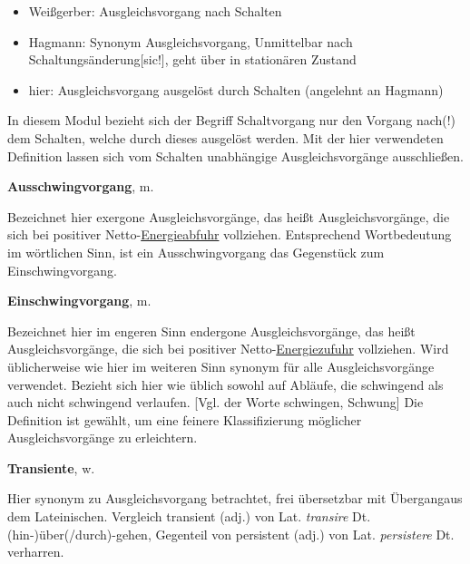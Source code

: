 {\begin{frame}
        \begin{itemize}
            \item Weißgerber: Ausgleichsvorgang nach Schalten\cite[S. 1]{weissgerber3}
            \item Hagmann: Synonym Ausgleichsvorgang, Unmittelbar nach Schaltungsänderung[sic!], geht über in stationären Zustand\cite[S. 362]{hagmann}
            \item hier: Ausgleichsvorgang ausgelöst durch Schalten (angelehnt an Hagmann)
        \end{itemize}

        In diesem Modul bezieht sich der Begriff Schaltvorgang nur den Vorgang nach(!) dem Schalten, welche durch dieses ausgelöst werden.
        Mit der hier verwendeten Definition lassen sich vom Schalten unabhängige Ausgleichsvorgänge ausschließen. 


    \textbf{Ausschwingvorgang}, m.

        Bezeichnet hier exergone Ausgleichsvorgänge, das heißt Ausgleichsvorgänge, die sich bei positiver Netto-\underline{Energieabfuhr} vollziehen. 
        Entsprechend Wortbedeutung im wörtlichen Sinn, ist ein Ausschwingvorgang das Gegenstück zum Einschwingvorgang.

    \textbf{Einschwingvorgang}, m.

        Bezeichnet hier im engeren Sinn endergone Ausgleichsvorgänge, das heißt Ausgleichsvorgänge, die sich bei positiver Netto-\underline{Energiezufuhr} vollziehen. 
        Wird üblicherweise wie hier im weiteren Sinn synonym für alle Ausgleichsvorgänge verwendet.
        Bezieht sich hier wie üblich sowohl auf Abläufe, die schwingend als auch nicht schwingend verlaufen. [Vgl. der Worte schwingen, Schwung]
        Die Definition ist gewählt, um eine feinere Klassifizierung möglicher Ausgleichsvorgänge zu erleichtern.
    
    \textbf{Transiente}, w. %

        Hier synonym zu Ausgleichsvorgang betrachtet, frei übersetzbar mit \glqq Übergang\grqq aus dem Lateinischen.
        Vergleich transient (adj.) von Lat. \textit{transire} Dt. (hin-)über(/durch)-gehen, 
	    Gegenteil von persistent (adj.) von Lat. \textit{persistere} Dt. verharren.

\end{frame}
}%

